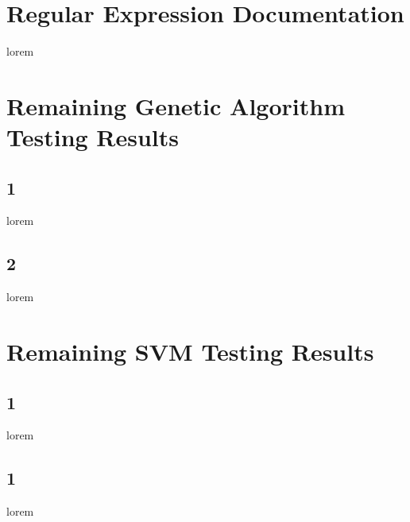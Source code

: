 \begin{appendices}

\chapter{Regular Expression Documentation}
lorem

\chapter{Remaining Genetic Algorithm Testing Results}

\section{1}
lorem
\section{2}
lorem

\chapter{Remaining SVM Testing Results}

\section{1}
lorem
\section{1}
lorem

\end{appendices}

